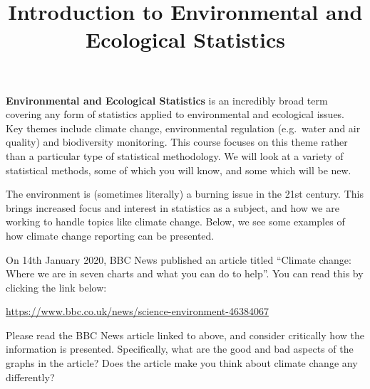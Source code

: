 \documentclass[
  letterpaper,
  DIV=11,
  numbers=noendperiod]{scrartcl}
\title{Introduction to Environmental and Ecological Statistics}
\author{}
\date{}
\makeatletter
\renewcommand{\maketitle}{\bgroup\setlength{\parindent}{0pt}
\begin{flushleft}
  {\color{uniblue}\sffamily\huge\textbf{\@title}} \vspace{0.3cm} \newline
  {\Large {\@subtitle}} \newline
  \@author
\end{flushleft}\egroup
}
\makeatother
\begin{document}
\maketitle

\pagestyle{mystyle}

\textbf{Environmental and Ecological Statistics} is an incredibly broad
term covering any form of statistics applied to environmental and
ecological issues. Key themes include climate change, environmental
regulation (e.g.~water and air quality) and biodiversity monitoring.
This course focuses on this theme rather than a particular type of
statistical methodology. We will look at a variety of statistical
methods, some of which you will know, and some which will be new.

The environment is (sometimes literally) a burning issue in the 21st
century. This brings increased focus and interest in statistics as a
subject, and how we are working to handle topics like climate change.
Below, we see some examples of how climate change reporting can be
presented.

\begin{tcolorbox}[enhanced jigsaw, coltitle=black, colframe=quarto-callout-note-color-frame, bottomrule=.15mm, leftrule=.75mm, toptitle=1mm, titlerule=0mm, title={BBC News article on climate change}, bottomtitle=1mm, toprule=.15mm, rightrule=.15mm, arc=.35mm, opacityback=0, opacitybacktitle=0.6, left=2mm, colbacktitle=quarto-callout-note-color!10!white, breakable, colback=white]

On 14th January 2020, BBC News published an article titled ``Climate
change: Where we are in seven charts and what you can do to help''. You
can read this by clicking the link below:

\url{https://www.bbc.co.uk/news/science-environment-46384067}

\end{tcolorbox}

\begin{tcolorbox}[enhanced jigsaw, coltitle=black, colframe=quarto-callout-tip-color-frame, bottomrule=.15mm, leftrule=.75mm, toptitle=1mm, titlerule=0mm, title={Exercise 1}, bottomtitle=1mm, toprule=.15mm, rightrule=.15mm, arc=.35mm, opacityback=0, opacitybacktitle=0.6, left=2mm, colbacktitle=quarto-callout-tip-color!10!white, breakable, colback=white]

Please read the BBC News article linked to above, and consider
critically how the information is presented. Specifically, what are the
good and bad aspects of the graphs in the article? Does the article make
you think about climate change any differently?

\end{tcolorbox}
\end{document}
